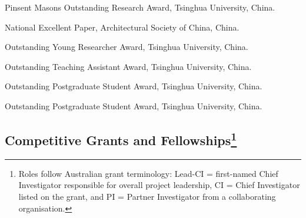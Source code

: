 \documentclass[11pt,a4paper]{report} %
\begin{document}
\begin{tablist}
        \item[2010] \tab{}Pinsent Masons Outstanding Research Award, Tsinghua University, China.
        
        \item[2010] \tab{}National Excellent Paper, Architectural Society of China, China.
        
        \item[2009--10] \tab{}Outstanding Young Researcher Award, Tsinghua University, China.
        
        \item[2009] \tab{}Outstanding Teaching Assistant Award, Tsinghua University, China.
        
        \item[2008--09] \tab{}Outstanding Postgraduate Student Award, Tsinghua University, China.
        
        \item[2006] \tab{}Outstanding Postgraduate Student Award, Tsinghua University, China.

    \end{tablist}

    \subsection*{Competitive Grants and Fellowships\footnote{Roles follow Australian grant terminology: Lead-CI = first-named Chief Investigator responsible for overall project leadership, CI = Chief Investigator listed on the grant, and PI = Partner Investigator from a collaborating organisation.}}
\end{document}
